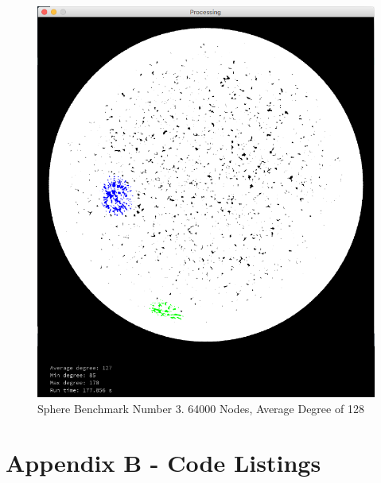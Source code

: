 \documentclass{article}
\begin{document}
\begin{figure}
    \centering
    \includegraphics[scale=0.45]{./images/sphere_2.png}
    \caption{Sphere Benchmark Number 3. 64000 Nodes, Average Degree of 128}
    \label{sphere2}
\end{figure}

\newpage

\section{Appendix B - Code Listings}

\lstset{style=codestyle}




\end{document}
